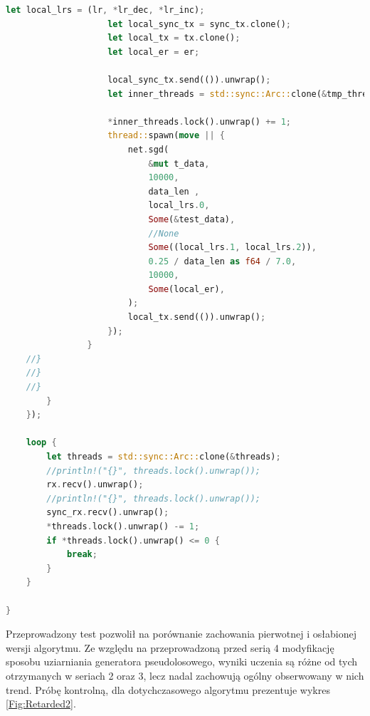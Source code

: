 \documentclass[12pt,twoside]{article}
\begin{document}
\begin{lstlisting}[language=Rust,caption=Kod wykorzystany do przeprowadzenia dodatkowego eksperymentu w serii 6,label={lst:Retarded1}]
                    let local_lrs = (lr, *lr_dec, *lr_inc);
                    let local_sync_tx = sync_tx.clone();
                    let local_tx = tx.clone();
                    let local_er = er;

                    local_sync_tx.send(()).unwrap();
                    let inner_threads = std::sync::Arc::clone(&tmp_threads);

                    *inner_threads.lock().unwrap() += 1;
                    thread::spawn(move || {
                        net.sgd(
                            &mut t_data,
                            10000,
                            data_len ,
                            local_lrs.0,
                            Some(&test_data),
                            //None
                            Some((local_lrs.1, local_lrs.2)),
                            0.25 / data_len as f64 / 7.0,
                            10000,
                            Some(local_er),
                        );
                        local_tx.send(()).unwrap();
                    });
                }
    //}
    //}
    //}
        }
    });

    loop {
        let threads = std::sync::Arc::clone(&threads);
        //println!("{}", threads.lock().unwrap());
        rx.recv().unwrap();
        //println!("{}", threads.lock().unwrap());
        sync_rx.recv().unwrap();
        *threads.lock().unwrap() -= 1;
        if *threads.lock().unwrap() <= 0 {
            break;
        }
    }

}
\end{lstlisting}

Przeprowadzony test pozwolił na porównanie zachowania pierwotnej i osłabionej wersji algorytmu.
Ze względu na przeprowadzoną przed serią 4 modyfikację sposobu uziarniania generatora pseudolosowego, wyniki uczenia  są różne od tych otrzymanych w seriach 2 oraz 3, lecz nadal zachowują ogólny obserwowany w nich trend.
Próbę kontrolną, dla dotychczasowego algorytmu prezentuje wykres \ref{Fig:Retarded2}.
\end{document}
